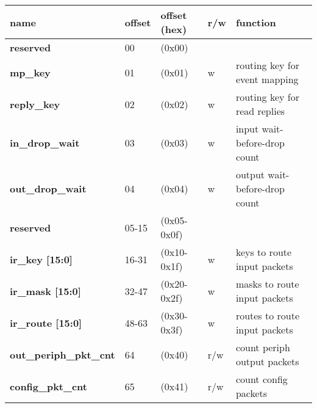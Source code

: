 \documentclass[11pt,a4paper,twoside]{article}
\begin{document}
\begin{center}
\begin{table}[!h]
	\begin{tabularx}{\textwidth}{| p{34mm} p{13mm} p{21mm} p{7mm} X |}
		\hline
		\textbf{name}                        & \textbf{offset}            & \textbf{offset} (hex)          & \textbf{r/w}        & \textbf{function} \\%
		\hline
		\hline
		\cellcolor{gray!25}\textbf{reserved} & \cellcolor{gray!25}00      & \cellcolor{gray!25}(0x00)      & \cellcolor{gray!25} & \cellcolor{gray!25}\\%
		\textbf{mp\_key}                     & 01                         & (0x01)                         & w                   & routing key for event mapping \\%
		\textbf{reply\_key}                  & 02                         & (0x02)                         & w                   & routing key for read replies \\%
		\textbf{in\_drop\_wait}              & 03                         & (0x03)                         & w                   & input wait-before-drop count \\%
		\textbf{out\_drop\_wait}             & 04                         & (0x04)                         & w                   & output wait-before-drop count \\%
		\cellcolor{gray!25}\textbf{reserved} & \cellcolor{gray!25}05-15   & \cellcolor{gray!25}(0x05-0x0f) & \cellcolor{gray!25} & \cellcolor{gray!25}\\%
		\textbf{ir\_key [15:0]}              & 16-31                      & (0x10-0x1f)                    & w                   & keys to route input packets \\%
		\textbf{ir\_mask [15:0]}             & 32-47                      & (0x20-0x2f)                    & w                   & masks to route input packets \\%
		\textbf{ir\_route [15:0]}            & 48-63                      & (0x30-0x3f)                    & w                   & routes to route input packets \\%
		\textbf{out\_periph\_pkt\_cnt}       & 64                         & (0x40)                         & r/w                 & count periph output packets\\%
		\textbf{config\_pkt\_cnt}            & 65                         & (0x41)                         & r/w                 & count config packets \\%

\end{tabularx}
\end{table}
\end{center}
\end{document}
